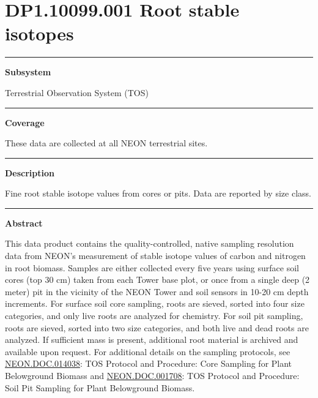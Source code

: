 \documentclass[]{article}
\begin{document}
\section{DP1.10099.001 Root stable
isotopes}\label{dp1.10099.001-root-stable-isotopes}

\begin{center}\rule{0.5\linewidth}{\linethickness}\end{center}

\textbf{Subsystem}

Terrestrial Observation System (TOS)

\begin{center}\rule{0.5\linewidth}{\linethickness}\end{center}

\textbf{Coverage}

These data are collected at all NEON terrestrial sites.

\begin{center}\rule{0.5\linewidth}{\linethickness}\end{center}

\textbf{Description}

Fine root stable isotope values from cores or pits. Data are reported by
size class.

\begin{center}\rule{0.5\linewidth}{\linethickness}\end{center}

\textbf{Abstract}

This data product contains the quality-controlled, native sampling
resolution data from NEON's measurement of stable isotope values of
carbon and nitrogen in root biomass. Samples are either collected every
five years using surface soil cores (top 30 cm) taken from each Tower
base plot, or once from a single deep (2 meter) pit in the vicinity of
the NEON Tower and soil sensors in 10-20 cm depth increments. For
surface soil core sampling, roots are sieved, sorted into four size
categories, and only live roots are analyzed for chemistry. For soil pit
sampling, roots are sieved, sorted into two size categories, and both
live and dead roots are analyzed. If sufficient mass is present,
additional root material is archived and available upon request. For
additional details on the sampling protocols, see
\href{http://data.neonscience.org/api/v0/documents/NEON.DOC.014038vE}{NEON.DOC.014038}:
TOS Protocol and Procedure: Core Sampling for Plant Belowground Biomass
and
\href{http://data.neonscience.org/api/v0/documents/NEON.DOC.001708vA}{NEON.DOC.001708}:
TOS Protocol and Procedure: Soil Pit Sampling for Plant Belowground
Biomass.
\end{document}
